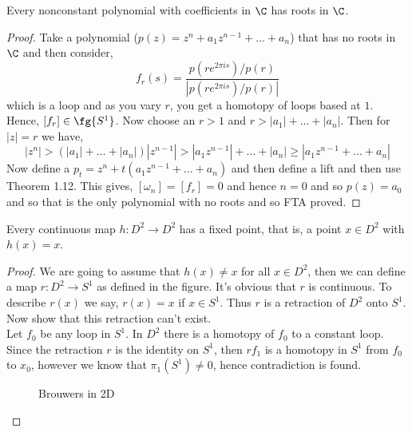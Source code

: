 \begin{nthm}[FTA]
  Every nonconstant polynomial with coefficients in $\C$ has roots in $\C$.
\end{nthm}
\begin{proof}
  Take a polynomial ($p(z) = z^n + a_1z^{n-1} + \dots + a_n$) that has no roots in $\C$ and then consider,
  $$ f_r(s) = \frac{p(re^{2\pi is})/p(r)}{|p(re^{2\pi is})/p(r)|} $$
  which is a loop and as you vary $r$, you get a homotopy of loops based at $1$. Hence, $[f_r] \in \fg {S^1}$. Now choose an $r > 1$ and $r > |a_1| + \dots + |a_n|$. Then for $|z| = r$ we have,
  $$ |z^n| > (|a_1| + \dots + |a_n|)|z^{n-1}| > |a_1z^{n-1}| + \dots + |a_n| \ge |a_1z^{n-1} + \dots + a_n| $$
  Now define a $p_t = z^n + t(a_1z^{n-1} + \dots + a_n)$ and then define a lift and then use Theorem 1.12. This gives, $[\omega_n] = [f_r] = 0$ and hence $n = 0$ and so $p(z) = a_0$ and so that is the only polynomial with no roots and so FTA proved.
\end{proof}

\begin{nthm}
  Every continuous map $h : D^2 \to D^2$ has a fixed point, that is, a point $x \in D^2$ with $h(x) = x$.
\end{nthm}
\begin{proof}
  We are going to assume that $h(x) \neq x$ for all $x \in D^2$, then we can define a map $r : D^2 \to S^1$ as defined in the figure. It's obvious that $r$ is continuous. To describe $r(x)$ we say, $r(x) = x$ if $x \in S^1$. Thus $r$ is a retraction of $D^2$ onto $S^1$. Now show that this retraction can't exist.\\
  Let $f_0$ be any loop in $S^1$. In $D^2$ there is a homotopy of $f_0$ to a constant loop. Since the retraction $r$ is the identity on $S^1$, then $rf_1$ is a homotopy in $S^1$ from $f_0$ to $x_0$, however we know that $\pi_1(S^1) \ne 0$, hence contradiction is found.
  \begin{figure}[!ht]
  \centering
  \caption{Brouwers in 2D}
  \end{figure}
  \end{proof}

